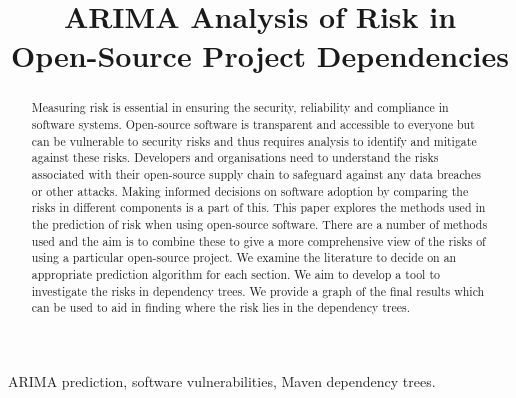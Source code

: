 \documentclass[10pt, compsoc, conference]{IEEEtran}
\begin{document}
\title{ARIMA Analysis of Risk in \\Open-Source Project Dependencies}

\author{
\and
{}
    }

\maketitle

\vspace*{-1.5234cm}

\thispagestyle{plain}
\pagestyle{plain}

\begin{description}
    \item[]
    \begin{center}
        \end{center}
    \item[]
\end{description}


\begin{abstract}
Measuring risk is essential in ensuring the security, reliability and compliance in software systems. Open-source software is transparent and accessible to everyone but can be vulnerable to security risks and thus requires analysis to identify and mitigate against these risks. Developers and organisations need to understand the risks associated with their open-source supply chain to safeguard against any data breaches or other attacks. Making informed decisions on software adoption by comparing the risks in different components is a part of this. This paper explores the methods used in the prediction of risk when using open-source software. There are a number of methods used and the aim is to combine these to give a more comprehensive view of the risks of using a particular open-source project. We examine the literature to decide on an appropriate prediction algorithm for each section. We aim to develop a tool to investigate the risks in dependency trees. We provide a graph of the final results which can be used to aid in finding where the risk lies in the dependency trees. 
\end{abstract}

\begin{IEEEkeywords}
ARIMA prediction, software vulnerabilities, Maven dependency trees.
\end{IEEEkeywords}
\end{document}

